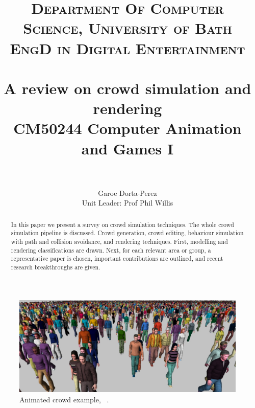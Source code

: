 \documentclass[6pt]{article} %
\title{	
\normalfont \normalsize 
\textsc{Department Of Computer Science, University of Bath} \\ [5pt] %
\textsc{EngD in Digital Entertainment} \\ [5pt] 
\horrule{0.7pt} \\[0.2cm] %
\Huge A review on crowd simulation and rendering \\ %
\vspace{7 mm}
\Large CM50244 \: Computer Animation and Games I \\
\horrule{0.7pt} \\[0.0cm] %
}
\author{Garoe Dorta-Perez \\ \Large Unit Leader: Prof Phil Willis \\}  %
\begin{document}
\vspace*{\fill}
\begin{center}
	\begin{minipage}{1.0\textwidth}
		\maketitle %
		\thispagestyle{empty}
	\end{minipage}
\end{center}



\vfill %
\begin{abstract}
\normalsize %
In this paper we present a survey on crowd simulation techniques.
The whole crowd simulation pipeline is discussed.
Crowd generation, crowd editing, behaviour simulation with path and collision avoidance, and rendering techniques.
First, modelling and rendering classifications are drawn.
Next, for each relevant area or group, a representative paper is chosen, important contributions are outlined, and recent research breakthroughs are given.
\end{abstract}
\vfill %

\clearpage %



\begin{figure}
		\centering
		\includegraphics[scale=0.3]{images/crowd2}
		\caption{Animated crowd example, ~\cite{ruiz2013}.}
\end{figure}
\end{document}
